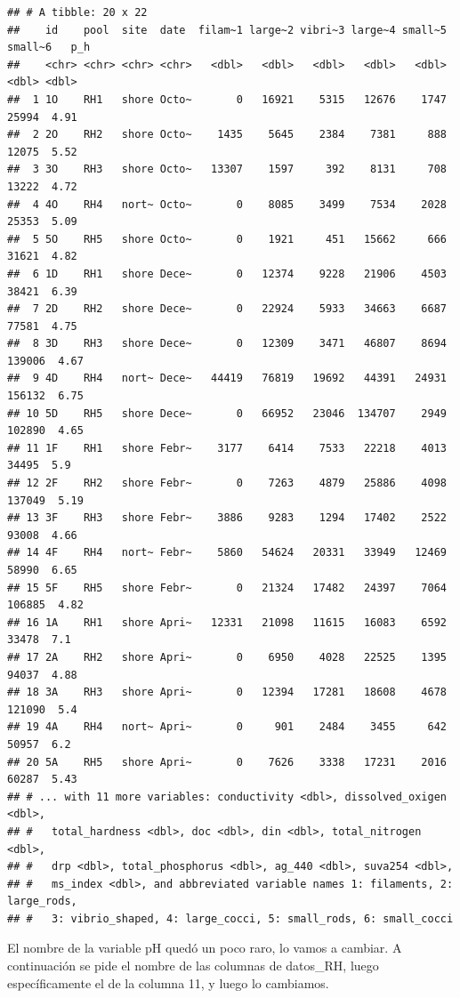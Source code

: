 \documentclass[
]{book}
\begin{document}
\begin{verbatim}
## # A tibble: 20 x 22
##    id    pool  site  date  filam~1 large~2 vibri~3 large~4 small~5 small~6   p_h
##    <chr> <chr> <chr> <chr>   <dbl>   <dbl>   <dbl>   <dbl>   <dbl>   <dbl> <dbl>
##  1 1O    RH1   shore Octo~       0   16921    5315   12676    1747   25994  4.91
##  2 2O    RH2   shore Octo~    1435    5645    2384    7381     888   12075  5.52
##  3 3O    RH3   shore Octo~   13307    1597     392    8131     708   13222  4.72
##  4 4O    RH4   nort~ Octo~       0    8085    3499    7534    2028   25353  5.09
##  5 5O    RH5   shore Octo~       0    1921     451   15662     666   31621  4.82
##  6 1D    RH1   shore Dece~       0   12374    9228   21906    4503   38421  6.39
##  7 2D    RH2   shore Dece~       0   22924    5933   34663    6687   77581  4.75
##  8 3D    RH3   shore Dece~       0   12309    3471   46807    8694  139006  4.67
##  9 4D    RH4   nort~ Dece~   44419   76819   19692   44391   24931  156132  6.75
## 10 5D    RH5   shore Dece~       0   66952   23046  134707    2949  102890  4.65
## 11 1F    RH1   shore Febr~    3177    6414    7533   22218    4013   34495  5.9 
## 12 2F    RH2   shore Febr~       0    7263    4879   25886    4098  137049  5.19
## 13 3F    RH3   shore Febr~    3886    9283    1294   17402    2522   93008  4.66
## 14 4F    RH4   nort~ Febr~    5860   54624   20331   33949   12469   58990  6.65
## 15 5F    RH5   shore Febr~       0   21324   17482   24397    7064  106885  4.82
## 16 1A    RH1   shore Apri~   12331   21098   11615   16083    6592   33478  7.1 
## 17 2A    RH2   shore Apri~       0    6950    4028   22525    1395   94037  4.88
## 18 3A    RH3   shore Apri~       0   12394   17281   18608    4678  121090  5.4 
## 19 4A    RH4   nort~ Apri~       0     901    2484    3455     642   50957  6.2 
## 20 5A    RH5   shore Apri~       0    7626    3338   17231    2016   60287  5.43
## # ... with 11 more variables: conductivity <dbl>, dissolved_oxigen <dbl>,
## #   total_hardness <dbl>, doc <dbl>, din <dbl>, total_nitrogen <dbl>,
## #   drp <dbl>, total_phosphorus <dbl>, ag_440 <dbl>, suva254 <dbl>,
## #   ms_index <dbl>, and abbreviated variable names 1: filaments, 2: large_rods,
## #   3: vibrio_shaped, 4: large_cocci, 5: small_rods, 6: small_cocci
\end{verbatim}

El nombre de la variable pH quedó un poco raro, lo vamos a cambiar. A continuación se pide el nombre de las columnas de datos\_RH, luego específicamente el de la columna 11, y luego lo cambiamos.
\end{document}
